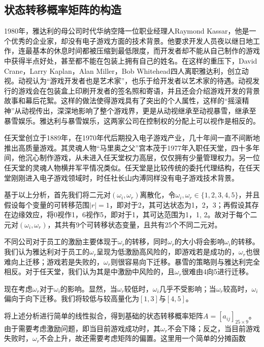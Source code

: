 \documentclass[hyperref]{ctexart}
\begin{document}
\begin{multicols}{2}
	\subsection{状态转移概率矩阵的构造}
	    1980年，雅达利的母公司时代华纳空降一位职业经理人Raymond Kassar，他是一个优秀的企业家，却没有电子游戏方面的技术背景。他要求开发人员夜以继日地工作，连最基本的休息时间都被压缩到最低限度，而开发者却不能从自己制作的游戏中获得半点好处，甚至都不能在包装上拥有自己的姓名。在这样的重压下，David Crane，Larry Kaplan，Alan Miller，Bob Whitehead四人离职雅达利，创立动视。动视认为“游戏开发者也是艺术家”，也乐于给开发者以艺术家的待遇。动视发行的游戏会在包装盒上印刷开发者的签名照和寄语，并且还会介绍游戏开发的背景故事和幕后花絮。这样的做法使得游戏具有了突出的个人属性，这样的“摇滚精神”从动视传出，深深地影响了整个游戏界，更是从动视继承至动视暴雪，继承至暴雪娱乐。雅达利与暴雪娱乐，这两家公司在控制权的分配上可以视作是相反的。
	    \par
	    任天堂创立于1889年，在1970年代后期投入电子游戏产业，几十年间一直不间断地推出高质量游戏。其灵魂人物“马里奥之父”宫本茂于1977年入职任天堂，四十多年间，他沉心制作游戏，从未进入任天堂权力高层，仅仅拥有少量管理权力。另一位任天堂的灵魂人物横井军平情况类似。任天堂是比较传统的委托代理结构，在任天堂刚刚进入电子游戏领域时，时任社长山内溥同样没有电子游戏技术背景。
	    \par
	    基于以上分析，首先我们将二元对$(\omega_i, \omega_r)$离散化，令$\omega_i , \omega_r \in \{1,2,3,4,5\} $，并且假设每个变量的可转移范围$|r| = 1$，即对于2，其可达状态为1，2，3；再假设其存在边缘效应，将0视作1，6视作5，即对于1，其可达范围为1，1, 2。故对于每个二元对$(\omega_i, \omega_r)$，其共有9个可转移状态变量，且共有25个不同二元对。
	    \par
        不同公司对于员工的激励主要体现于$\omega_r$的转移，同时$\omega_r$的大小将会影响$\omega_i$的转移。我们认为雅达利对于员工的$\omega_r$呈现为低激励高风险的，即游戏若是成功的，$\omega_r$也很难向上迁移；游戏若是失败的，$\omega_r$则很容易向下迁移。暴雪的策略则与雅达利完全相反。对于任天堂，我们认为其是中激励中风险的，且$\omega_r$很难由4向5进行迁移。
        \par
        现在考虑$\omega_r$对于$\omega_i$的影响。显然，当$\omega_r$较低时，$\omega_i$几乎不受影响；当$\omega_r$较高时，$\omega_i$偏向于向下迁移。我们将较低与较高量化为$[1, 3]$与$[4,5]$。
        \par
        将上述分析进行简单的线性拟合，得到基础的状态转移概率矩阵$A = [a_{ij}]_{25 \times 9}$。由于需要考虑激励问题，即当目前游戏成功时，其$\omega_r$不会下降；反之，当目前游戏失败时，$\omega_r$不会上升，故还需要考虑矩阵的偏置。这里用一个简单的分摊函数\par

\end{multicols}
\end{document}
